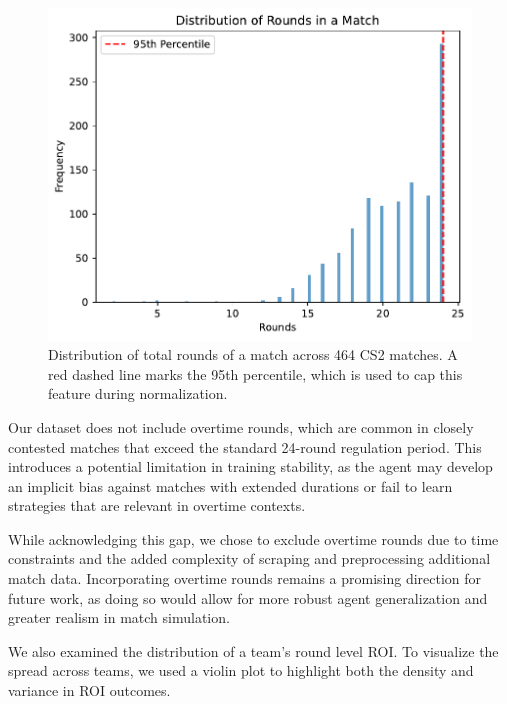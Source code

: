 \documentclass[sigconf]{acmart}
\begin{document}
\begin{figure}[ht]
  \centering
  \includegraphics[width=0.9\linewidth]{total_rounds_distribution.pdf}
  \caption{Distribution of total rounds of a match across 464 CS2 matches. A red dashed line marks the 95th percentile, which is used to cap this feature during normalization.}
  \label{fig:round_duration_dist}
\end{figure}

\smallskip

Our dataset does not include overtime rounds, which are common in closely contested matches that exceed the standard 24-round regulation period. This introduces a potential limitation in training stability, as the agent may develop an implicit bias against matches with extended durations or fail to learn strategies that are relevant in overtime contexts.

While acknowledging this gap, we chose to exclude overtime rounds due to time constraints and the added complexity of scraping and preprocessing additional match data. Incorporating overtime rounds remains a promising direction for future work, as doing so would allow for more robust agent generalization and greater realism in match simulation.

We also examined the distribution of a team's round level ROI. To visualize the spread across teams, we used a violin plot to highlight both the density and variance in ROI outcomes.
\end{document}
